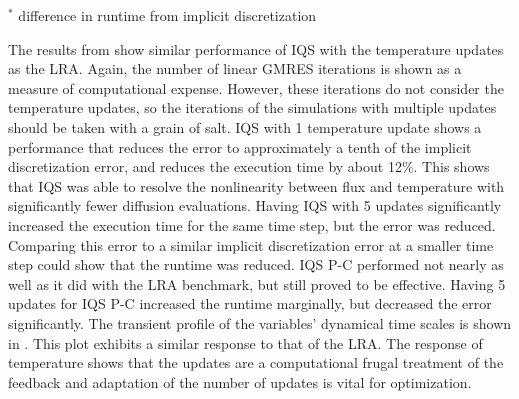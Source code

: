\begin{table}[htb]
\begin{center}
\end{center}
\vspace{-3mm}
$^*$ difference in runtime from implicit discretization 
\caption{Transient-15 Error and Runtime Results}
\label{tab:tran15}
\end{table}

The results from  show similar performance of IQS with the temperature updates as the LRA. Again, the number of linear GMRES iterations is shown as a measure of computational expense. However, these iterations do not consider the temperature updates, so the iterations of the simulations with multiple updates should be taken with a grain of salt. IQS with 1 temperature update shows a performance that reduces the error to approximately a tenth of the implicit discretization error, and reduces the execution time by about 12\%.  This shows that IQS was able to resolve the nonlinearity between flux and temperature with significantly fewer diffusion evaluations.  Having IQS with 5 updates significantly increased the execution time for the same time step, but the error was reduced.  Comparing this error to a similar implicit discretization error at a smaller time step could show that the runtime was reduced. IQS P-C performed not nearly as well as it did with the LRA benchmark, but still proved to be effective.  Having 5 updates for IQS P-C increased the runtime marginally, but decreased the error significantly.  The transient profile of the variables' dynamical time scales is shown in .  This plot exhibits a similar response to that of the LRA. The response of temperature shows that the updates are a computational frugal treatment of the feedback and adaptation of the number of updates is vital for optimization. \\

